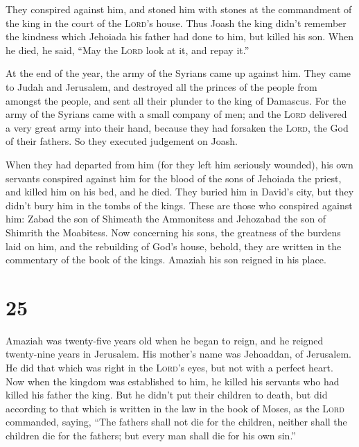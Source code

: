  They conspired against him, and stoned him with stones
at the commandment of the king in the court of the \textsc{Lord}'s
house.  Thus Joash the king didn't remember the kindness
which Jehoiada his father had done to him, but killed his son. When he
died, he said, ``May the \textsc{Lord} look at it, and repay it.''

 At the end of the year, the army of the Syrians came up
against him. They came to Judah and Jerusalem, and destroyed all the
princes of the people from amongst the people, and sent all their
plunder to the king of Damascus.  For the army of the
Syrians came with a small company of men; and the \textsc{Lord}
delivered a very great army into their hand, because they had forsaken
the \textsc{Lord}, the God of their fathers. So they executed judgement
on Joash.

 When they had departed from him (for they left him
seriously wounded), his own servants conspired against him for the blood
of the sons of Jehoiada the priest, and killed him on his bed, and he
died. They buried him in David's city, but they didn't bury him in the
tombs of the kings.  These are those who conspired
against him: Zabad the son of Shimeath the Ammonitess and Jehozabad the
son of Shimrith the Moabitess.  Now concerning his sons,
the greatness of the burdens laid on him, and the rebuilding of God's
house, behold, they are written in the commentary of the book of the
kings. Amaziah his son reigned in his place.

\hypertarget{section-24}{%
\section{25}\label{section-24}}

 Amaziah was twenty-five years old when he began to reign,
and he reigned twenty-nine years in Jerusalem. His mother's name was
Jehoaddan, of Jerusalem.  He did that which was right in
the \textsc{Lord}'s eyes, but not with a perfect heart. 
Now when the kingdom was established to him, he killed his servants who
had killed his father the king.  But he didn't put their
children to death, but did according to that which is written in the law
in the book of Moses, as the \textsc{Lord} commanded, saying, ``The
fathers shall not die for the children, neither shall the children die
for the fathers; but every man shall die for his own sin.''


